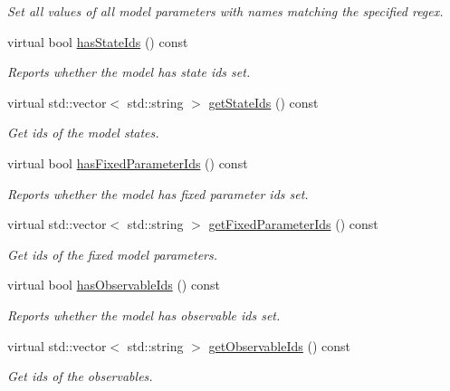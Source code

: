\begin{DoxyCompactItemize}
\begin{DoxyCompactList}\small\item\em Set all values of all model parameters with names matching the specified regex. \end{DoxyCompactList}\item 
virtual bool \mbox{\hyperlink{classamici_1_1_model_ad85d26b9b10e042e39685ac6c39d6a50}{has\+State\+Ids}} () const
\begin{DoxyCompactList}\small\item\em Reports whether the model has state ids set. \end{DoxyCompactList}\item 
virtual std\+::vector$<$ std\+::string $>$ \mbox{\hyperlink{classamici_1_1_model_a15fad6b42dcd725bdfc74fbab31b85e2}{get\+State\+Ids}} () const
\begin{DoxyCompactList}\small\item\em Get ids of the model states. \end{DoxyCompactList}\item 
virtual bool \mbox{\hyperlink{classamici_1_1_model_af50d86316e6930bc98e82afc3893e2ff}{has\+Fixed\+Parameter\+Ids}} () const
\begin{DoxyCompactList}\small\item\em Reports whether the model has fixed parameter ids set. \end{DoxyCompactList}\item 
virtual std\+::vector$<$ std\+::string $>$ \mbox{\hyperlink{classamici_1_1_model_aa9278a175bc86b5b020df35dd2581734}{get\+Fixed\+Parameter\+Ids}} () const
\begin{DoxyCompactList}\small\item\em Get ids of the fixed model parameters. \end{DoxyCompactList}\item 
virtual bool \mbox{\hyperlink{classamici_1_1_model_a328bd98abbf8d7ccb8f6cebbc76e5b61}{has\+Observable\+Ids}} () const
\begin{DoxyCompactList}\small\item\em Reports whether the model has observable ids set. \end{DoxyCompactList}\item 
virtual std\+::vector$<$ std\+::string $>$ \mbox{\hyperlink{classamici_1_1_model_a8d356757af0856dbdb6c45548f788377}{get\+Observable\+Ids}} () const
\begin{DoxyCompactList}\small\item\em Get ids of the observables. \end{DoxyCompactList}\item 

\end{DoxyCompactItemize}
